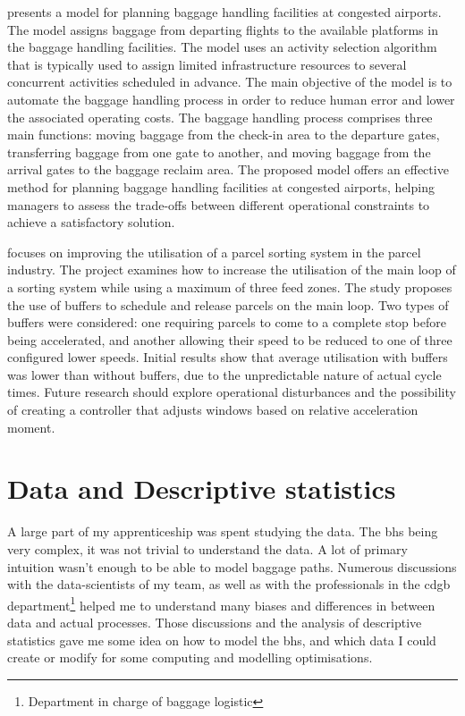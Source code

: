 \documentclass[12pt]{article}
\begin{document}
\cite{SchedulingBGF} presents a model for planning baggage handling facilities at congested airports. The model assigns baggage from departing flights to the available platforms in the baggage handling facilities. The model uses an activity selection algorithm that is typically used to assign limited infrastructure resources to several concurrent activities scheduled in advance. 
The main objective of the model is to automate the baggage handling process in order to reduce human error and lower the associated operating costs. The baggage handling process comprises three main functions: moving baggage from the check-in area to the departure gates, transferring baggage from one gate to another, and moving baggage from the arrival gates to the baggage reclaim area.
The proposed model offers an effective method for planning baggage handling facilities at congested airports, helping managers to assess the trade-offs between different operational constraints to achieve a satisfactory solution. \hfill \break

\cite{ImprovementofaSortationSystem} focuses on improving the utilisation of a parcel sorting system in the parcel industry. The project examines how to increase the utilisation of the main loop of a sorting system while using a maximum of three feed zones. The study proposes the use of buffers to schedule and release parcels on the main loop. Two types of buffers were considered: one requiring parcels to come to a complete stop before being accelerated, and another allowing their speed to be reduced to one of three configured lower speeds. Initial results show that average utilisation with buffers was lower than without buffers, due to the unpredictable nature of actual cycle times. Future research should explore operational disturbances and the possibility of creating a controller that adjusts windows based on relative acceleration moment.


\newpage
\section{Data and Descriptive statistics}

A large part of my apprenticeship was spent studying the data. The \acrlong{bhs} being very complex, it was not trivial to understand the data. A lot of primary intuition wasn't enough to be able to model baggage paths. Numerous discussions with the data-scientists of my team, as well as with the professionals in the \acrshort{cdgb} department\footnote{Department in charge of baggage logistic} helped me to understand many biases and differences in between data and actual processes. Those discussions and the analysis of descriptive statistics gave me some idea on how to model the \acrshort{bhs}, and which data I could create or modify for some computing and modelling optimisations. 
\end{document}
